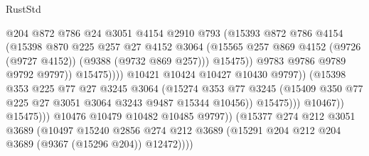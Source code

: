 \begin{lexlean}{RustStd}
\begin{coremodule}
                                        @204
                                        @872
                                        @786
                                        @24
                                        @3051
                                        @4154
                                        @2910
                                        @793
                                        (@15393
                                          @872
                                          @786
                                          @4154
                                          (@15398
                                            @870
                                            @225
                                            @257
                                            @27
                                            @4152
                                            @3064
                                            (@15565
                                              @257
                                              @869
                                              @4152
                                              (@9726 (@9727 @4152))
                                              (@9388 (@9732 @869 @257)))
                                            @15475))
                                        @9783
                                        @9786
                                        @9789
                                        @9792
                                        @9797))
                                    @15475))))
                            @10421
                            @10424
                            @10427
                            @10430
                            @9797))
                        (@15398
                          @353
                          @225
                          @77
                          @27
                          @3245
                          @3064
                          (@15274
                            @353
                            @77
                            @3245
                            (@15409 @350 @77 @225 @27 @3051 @3064 @3243 @9487 @15344 @10456))
                          @15475)))
                    @10467))
                @15475)))
          @10476
          @10479
          @10482
          @10485
          @9797))
      (@15377
        @274
        @212
        @3051
        @3689
        (@10497
          @15240
          @2856
          @274
          @212
          @3689
          (@15291 @204 @212 @204 @3689 (@9367 (@15296 @204)) @12472))))

\end{coremodule}
\end{lexlean}
